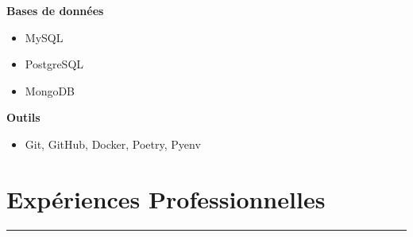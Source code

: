 \documentclass[a4paper,12pt]{article}
\newcommand{\sectionrule}[1]{%
\section*{#1}%
\vspace{-1em}%
\noindent\rule{\linewidth}{1pt}%
\vspace{0.5em}%
}
\begin{document}
\begin{paracol}{2}
\begin{rightcolumn}
\begin{minipage}[t][\dimexpr\textheight - 9em\relax][t]{\dimexpr\linewidth - 1.5em\relax}
{\begin{multicols}{2}
\vspace{1em}
\textbf{Bases de données}
\begin{itemize}[leftmargin=1.2em, nosep]
  \item MySQL
  \item PostgreSQL
  \item MongoDB
\end{itemize}

\vspace{1em}
\textbf{Outils}
\begin{itemize}[leftmargin=1.2em, nosep]
  \item Git, GitHub, Docker, Poetry, Pyenv
\end{itemize}

\end{multicols}
\vspace{0em}



\sectionrule{Expériences Professionnelles}

}
\end{minipage}
\end{rightcolumn}
\end{paracol}
\end{document}
